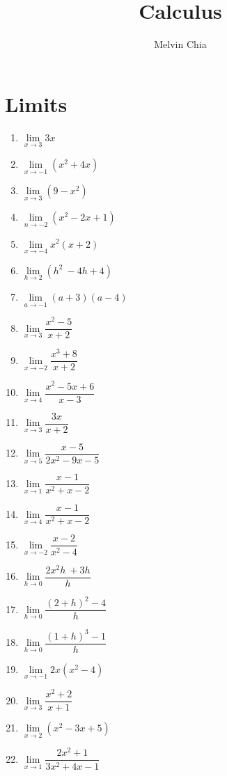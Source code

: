 \documentclass{report}
\title{Calculus}
\author{Melvin Chia}
\begin{document}
\maketitle
\onehalfspacing
\tableofcontents
\chapter{Limits}
\begin{multicols}{2}
      \begin{enumerate}
            \item $\lim\limits_{x \to 3}3x$
            \item $\lim\limits_{x \to -1}(x^2 + 4x)$
            \item $\lim\limits_{x \to 3}(9 - x^2)$
            \item $\lim\limits_{n\to-2}(x^{2}-2x+1)$
            \item $\lim\limits_{x\to-4}x^{2}(x+2)$
            \item $\lim\limits_{h\to2}(h^{2}\ -4h+4)$
            \item $\lim\limits_{a\to-1}(a+3)\left(a-4\right)$
            \item $\lim\limits_{x\to3}{\dfrac{x^{2}-5}{x+2}}$
            \item $\lim\limits_{x\to-2}{\dfrac{x^{3}+8}{x+2}}$
            \item $\lim\limits_{x\to4}\dfrac{x^2-5x+6}{x-3}$
            \item $\lim\limits_{x\to3}{\dfrac{3x}{x+2}}$
            \item $\lim\limits_{x\to5}{\dfrac{x-5}{2x^{2}-9x-5}}$
            \item $\lim\limits_{x\to1}{\dfrac{x-1}{x^{2}+x-2}}$
            \item $\lim\limits_{x\to4}{\dfrac{x-1}{x^{2}+x-2}}$
            \item $\lim\limits_{x\to-2}{\dfrac{x-2}{x^{2}-4}}$
            \item $\lim\limits_{h\to0}{\dfrac{2x^{2}h\ +3h}{h}}$
            \item $\lim\limits_{h\to0}\dfrac{{(2+h)}^{2}-4}{h}$
            \item $\lim\limits_{h\to0}{\dfrac{{(1+h)}^{3}-1}{h}}$
            \item $\lim\limits_{x\to-1}2x(x^{2}-4)$
            \item $\lim\limits_{x\to3}{\dfrac{x^{2}+2}{x+1}}$
            \item $\lim\limits_{x\to2}\left(x^{2}-3x+5\right)$
            \item $\lim\limits_{x\to1}{\dfrac{2x^{2}+1}{3x^{2}+4x-1}}$

\end{enumerate}
\end{multicols}
\end{document}
